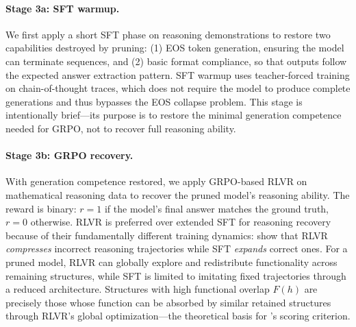 \paragraph{Stage 3a: SFT warmup.}
We first apply a short SFT phase on reasoning demonstrations to restore two capabilities destroyed by pruning: (1) EOS token generation, ensuring the model can terminate sequences, and (2) basic format compliance, so that outputs follow the expected answer extraction pattern.
SFT warmup uses teacher-forced training on chain-of-thought traces, which does not require the model to produce complete generations and thus bypasses the EOS collapse problem.
This stage is intentionally brief---its purpose is to restore the minimal generation competence needed for GRPO, not to recover full reasoning ability.

\paragraph{Stage 3b: GRPO recovery.}
With generation competence restored, we apply GRPO-based RLVR on mathematical reasoning data to recover the pruned model's reasoning ability.
The reward is binary: $r = 1$ if the model's final answer matches the ground truth, $r = 0$ otherwise.
RLVR is preferred over extended SFT for reasoning recovery because of their fundamentally different training dynamics: \citet{rlsqueezes2026} show that RLVR \emph{compresses} incorrect reasoning trajectories while SFT \emph{expands} correct ones.
For a pruned model, RLVR can globally explore and redistribute functionality across remaining structures, while SFT is limited to imitating fixed trajectories through a reduced architecture.
Structures with high functional overlap $F(h)$ are precisely those whose function can be absorbed by similar retained structures through RLVR's global optimization---the theoretical basis for \rasp{}'s scoring criterion.

